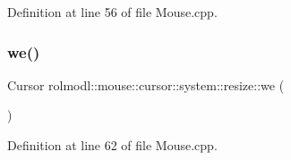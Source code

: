 Definition at line 56 of file Mouse.\+cpp.

\mbox{\label{namespacerolmodl_1_1mouse_1_1cursor_1_1system_1_1resize_ad6e5dd200f8ec02e2e12402a9f33e02b}} 
\subsubsection{\texorpdfstring{we()}{we()}}
{\footnotesize\ttfamily Cursor rolmodl\+::mouse\+::cursor\+::system\+::resize\+::we (\begin{DoxyParamCaption}{ }\end{DoxyParamCaption})}



Definition at line 62 of file Mouse.\+cpp.

